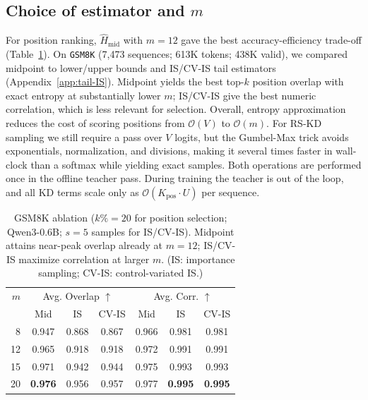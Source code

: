\documentclass[11pt]{article}
\begin{document}
\subsection{Choice of estimator and $m$}
For position ranking, $\widehat{H}_{\text{mid}}$ with $m{=}12$ gave the best accuracy-efficiency trade-off (Table~\ref{tab:entropy-ablation}).
On \texttt{GSM8K} (7{,}473 sequences; 613K tokens; 438K valid), we compared midpoint to lower/upper bounds and IS/CV-IS tail estimators (Appendix~\ref{app:tail-IS}).
Midpoint yields the best top-$k$ position overlap with exact entropy at substantially lower $m$; IS/CV-IS give the best numeric correlation, which is less relevant for selection.
Overall, entropy approximation reduces the cost of scoring positions from $\mathcal{O}(V)$ to $\mathcal{O}(m)$.
For RS-KD sampling we still require a pass over $V$ logits, but the Gumbel-Max trick avoids exponentials, normalization, and divisions, making it several times faster in wall-clock than a softmax while yielding exact samples.
Both operations are performed once in the offline teacher pass.
During training the teacher is out of the loop, and all KD terms scale only as $\mathcal{O}(K_{\text{pos}}\!\cdot\!U)$ per sequence.

\vspace{-0.5em}
\begin{table}[h]
	\centering
	\small
	\setlength{\tabcolsep}{6pt}
	\begin{tabular}{rcccccc}
		\toprule
		$m$ & \multicolumn{3}{c}{Avg. Overlap $\uparrow$} & \multicolumn{3}{c}{Avg. Corr. $\uparrow$}                                                   \\
		\cmidrule(lr){2-4}\cmidrule(lr){5-7}
		    & Mid                                         & IS                                        & CV-IS & Mid   & IS             & CV-IS          \\
		\midrule
		8   & 0.947                                       & 0.868                                     & 0.867 & 0.966 & 0.981          & 0.981          \\
		12  & 0.965                                       & 0.918                                     & 0.918 & 0.972 & 0.991          & 0.991          \\
		15  & 0.971                                       & 0.942                                     & 0.944 & 0.975 & 0.993          & 0.993          \\
		20  & \textbf{0.976}                              & 0.956                                     & 0.957 & 0.977 & \textbf{0.995} & \textbf{0.995} \\
		\bottomrule
	\end{tabular}
	\caption{GSM8K ablation ($k\%{=}20$ for position selection; Qwen3-0.6B; $s{=}5$ samples for IS/CV-IS). Midpoint attains near-peak overlap already at $m{=}12$; IS/CV-IS maximize correlation at larger $m$. (IS: importance sampling; CV-IS: control-variated IS.)}
	\label{tab:entropy-ablation}
\end{table}
\vspace{-0.75em}
\end{document}
